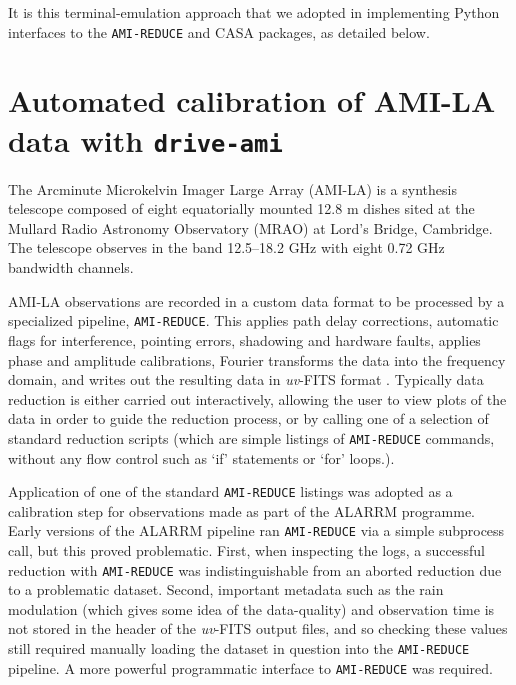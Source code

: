 \documentclass[5p,authoryear]{elsarticle}
\begin{document}
It is this terminal-emulation approach that we adopted in implementing Python interfaces to the \texttt{AMI-REDUCE} and CASA packages, as detailed below.


\section{Automated calibration of AMI-LA data with \texttt{drive-ami}}
\label{sec:drive-ami}
The Arcminute Microkelvin Imager Large Array (AMI-LA) is a synthesis telescope composed
of eight equatorially mounted 12.8 m dishes sited at the Mullard
Radio Astronomy Observatory (MRAO) at Lord’s Bridge, Cambridge. The
telescope observes in the band 12.5–18.2 GHz with eight 0.72 GHz
bandwidth channels. 

AMI-LA observations are recorded in a custom data format to be processed by a specialized pipeline, \texttt{AMI-REDUCE}. 
This applies path delay corrections, automatic flags for interference, pointing errors, shadowing and hardware faults, applies phase and amplitude calibrations, Fourier transforms the data into the frequency domain, and writes out the resulting data in \textit{uv}-FITS format \citep{Davies2009}. 
Typically data reduction is either carried out interactively, allowing the user to view plots of the data in order to guide the reduction process, or by calling one of a selection of standard reduction scripts (which are simple listings of \texttt{AMI-REDUCE} commands, without any flow control such as `if' statements or `for' loops.). 

Application of one of the standard \texttt{AMI-REDUCE} listings was adopted as a calibration step for observations made as part of the ALARRM programme. 
Early versions of the ALARRM pipeline ran \texttt{AMI-REDUCE} via a simple subprocess call, but this proved problematic. 
First, when inspecting the logs, a successful reduction with \texttt{AMI-REDUCE} was indistinguishable from an aborted reduction due to a problematic dataset. 
Second, important metadata such as the rain modulation (which gives some idea of the data-quality) and observation time is not stored in the header of the \textit{uv}-FITS output files, and so checking these values still required manually loading the dataset in question into the \texttt{AMI-REDUCE} pipeline. 
A more powerful programmatic interface to \texttt{AMI-REDUCE} was required.
\end{document}
